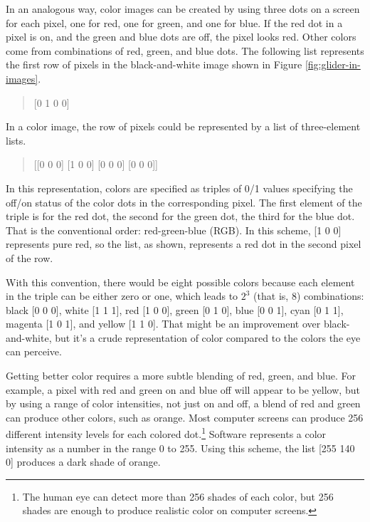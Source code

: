 In an analogous way, color images can be created by using three dots on a screen
for each pixel,
one for red, one for green, and one for blue.
If the red dot in a pixel is on, and the green and blue dots
are off, the pixel looks red. Other colors come from combinations
of red, green, and blue dots.
The following list represents the first row of pixels
in the black-and-white image shown in
Figure \ref{fig:glider-in-images}.
\begin{quote}
    \textsf{[0 1 0 0]}
\end{quote}
In a color image, the row of pixels could be represented by
a list of three-element lists.
\begin{quote}
    \textsf{[[0 0 0] [1 0 0] [0 0 0] [0 0 0]]}
\end{quote}
In this representation, colors are specified as triples of 0/1 values
specifying the off/on status of the color dots in the corresponding pixel.
The first element of the triple is for the red dot, the second
for the green dot, the third for the blue dot.
That is the conventional order:
red-green-blue (RGB).
In this scheme, \textsf{[1 0 0]} represents pure red,
so the list, as shown, represents a red dot in the second pixel of the row.

With this convention, there would be eight possible colors because
each element in the triple can be either zero or one,
which leads to $2^3$ (that is, $8$) combinations:
black \textsf{[0 0 0]},
white \textsf{[1 1 1]},
red \textsf{[1 0 0]},
green \textsf{[0 1 0]},
blue \textsf{[0 0 1]},
cyan \textsf{[0 1 1]},
magenta \textsf{[1 0 1]},
and
yellow \textsf{[1 1 0]}.
That might be an improvement over black-and-white,
but it's a crude representation of color
compared to the colors the eye can perceive.

Getting better color requires a more subtle blending of
red, green, and blue. For example, a pixel with red and green
on and blue off will appear to be yellow,
but by using a range of color intensities,
not just on and off, a blend of red and green can produce other
colors, such as orange. Most computer screens 
can produce 256 different intensity levels for each colored dot.\footnote{The 
human eye can detect more than 256 shades of
each color, but 256 shades are enough to produce realistic color
on computer screens.}
Software represents a color intensity as a number
in the range 0 to 255. 
Using this scheme, the list \textsf{[255 140 0]} produces
a dark shade of orange.

